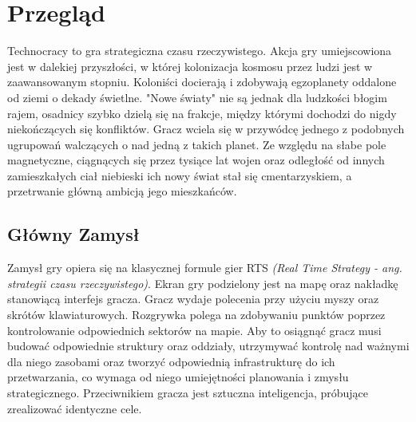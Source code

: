 \documentclass[a4paper]{scrreprt}
\title{\GameTiTle{}}
\subtitle{Dokument projektowy wersja 1}
\author{Laura Stasiulewicz}
\def \GameTiTle{Technocracy}
\begin{document}
\maketitle

\begin{abstract}
\GameTiTle{} to gra strategiczna czasu rzeczywistego. Celem gracza jest pokonanie komputerowego przeciwnika w walce o kontrolę nad punktem dominacji na mapie. Aby to uczynić, musi wykorzystać zdolność planowania, zarządzania zarówno jednostkami, jak i zasobami oraz wiedzy na temat dostępnych rodzajów oddziałów jakie może przywołać i interakcji między nimi.  %

\end{abstract}

{
  \hypersetup{linkcolor=black}
  \tableofcontents
}

\chapter{Przegląd}
\GameTiTle{} to gra strategiczna czasu rzeczywistego. Akcja gry umiejscowiona jest w dalekiej przyszłości, w której kolonizacja kosmosu przez ludzi jest w zaawansowanym stopniu. Koloniści docierają i zdobywają  egzoplanety oddalone od ziemi o dekady świetlne. "Nowe światy" nie są jednak dla ludzkości błogim rajem, osadnicy szybko dzielą się na frakcje, między którymi dochodzi do nigdy niekończących się konfliktów. Gracz wciela się w przywódcę jednego z podobnych ugrupowań walczących o nad jedną z takich planet. Ze względu na słabe pole magnetyczne, ciągnących się przez tysiące lat wojen oraz odległość od innych zamieszkałych ciał niebieski ich nowy świat stał się cmentarzyskiem, a przetrwanie główną ambicją jego mieszkańców.
\section{Główny Zamysł}
Zamysł gry opiera się na klasycznej formule gier RTS \emph{(Real Time Strategy - ang. strategii czasu rzeczywistego)}. Ekran gry podzielony jest na mapę oraz nakładkę stanowiącą interfejs gracza. Gracz wydaje polecenia przy użyciu myszy oraz skrótów klawiaturowych. Rozgrywka polega na zdobywaniu punktów poprzez kontrolowanie odpowiednich sektorów na mapie. Aby to osiągnąć gracz musi budować odpowiednie struktury oraz oddziały, utrzymywać kontrolę nad ważnymi dla niego zasobami oraz tworzyć odpowiednią infrastrukturę do ich przetwarzania, co wymaga od niego umiejętności planowania i zmysłu strategicznego. Przeciwnikiem gracza jest sztuczna inteligencja, próbujące zrealizować identyczne cele.
\end{document}
